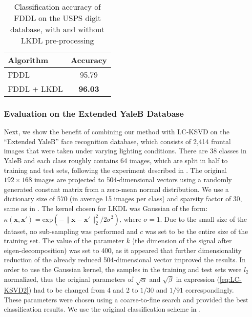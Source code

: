 \documentclass[journal]{IEEEtran}
\newcommand{\bx}{\mathbf{x}}
\begin{document}
\begin{table}[!t]
\caption{Classification accuracy of FDDL on the USPS digit database, with and without LKDL pre-processing}
\label{table:FDDL USPS_performance}
\centering
\begin{tabular}{||l||c||}
\multicolumn{1}{l}{\bf Algorithm}  &\multicolumn{1}{c}{\bf Accuracy} \\
\hline
FDDL & 95.79 \\
\hline
FDDL + LKDL & \textbf{96.03} \\
\hline
\end{tabular}
\end{table}

\subsubsection{Evaluation on the Extended YaleB Database}

Next, we show the benefit of combining our method with LC-KSVD on the ``Extended YaleB'' face recognition database, which consists of 2,414 frontal images that were taken under varying lighting conditions. There are 38 classes in YaleB and each class roughly contains 64 images, which are split in half to training and test sets, following the experiment described in \cite{LCKSVD}. The original $192 \times 168$ images are projected to 504-dimensional vectors using a randomly generated constant matrix from a zero-mean normal distribution.
We use a dictionary size of 570 (in average 15 images per class) and sparsity factor of 30, same as in \cite{LCKSVD}. The kernel chosen for LKDL was Gaussian of the form: $\kappa(\bx,\bx')=\text{exp}\left(-\|\bx-\bx'\|_2^2/2{\sigma}^2\right)$, where $\sigma=1$. Due to the small size of the dataset, no sub-sampling was performed and $c$ was set to be the entire size of the training set. The value of the parameter $k$ (the dimension of the signal after eigen-decomposition) was set to 400, as it appeared that further dimensionality reduction of the already reduced 504-dimensional vector improved the results. In order to use the Gaussian kernel, the samples in the training and test sets were $l_2$ normalized, thus the original parameters of $\sqrt{\alpha}$ and $\sqrt{\beta}$ in expression (\ref{eq:LC-KSVD2}) had to be changed from 4 and 2 to $1/30$ and $1/91$ correspondingly. These parameters were chosen using a coarse-to-fine search and provided the best classification results. We use the original classification scheme in \cite{LCKSVD,LCKSVD2}.
\end{document}
